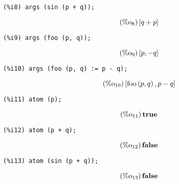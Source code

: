 \documentclass[12pt,leqno]{article}
\begin{document}
\begin{enumerate}
\begin{verbatim}
(%i8) args (sin (p + q));
\end{verbatim}
\begin{equation}
\tag{$\mathop{\mathrm{\%o}}_{8}$}\left[q+p\right]
\label{eq:doc-group1-code10-8-1}
\end{equation}
\begin{verbatim}
(%i9) args (foo (p, q));
\end{verbatim}
\begin{equation}
\tag{$\mathop{\mathrm{\%o}}_{9}$}\left[p, -q\right]
\label{eq:doc-group1-code10-9-1}
\end{equation}
\begin{verbatim}
(%i10) args (foo (p, q) := p - q);
\end{verbatim}
\begin{equation}
\tag{$\mathop{\mathrm{\%o}}_{10}$}\left[\mathop{\mathrm{foo}}\left(p, q\right), p-q\right]
\label{eq:doc-group1-code10-10-1}
\end{equation}
\begin{verbatim}
(%i11) atom (p);
\end{verbatim}
\begin{equation}
\tag{$\mathop{\mathrm{\%o}}_{11}$}\mathop{\mathbf{true}}
\label{eq:doc-group1-code10-11-1}
\end{equation}
\begin{verbatim}
(%i12) atom (p + q);
\end{verbatim}
\begin{equation}
\tag{$\mathop{\mathrm{\%o}}_{12}$}\mathop{\mathbf{false}}
\label{eq:doc-group1-code10-12-1}
\end{equation}
\begin{verbatim}
(%i13) atom (sin (p + q));
\end{verbatim}
\begin{equation}
\tag{$\mathop{\mathrm{\%o}}_{13}$}\mathop{\mathbf{false}}
\label{eq:doc-group1-code10-13-1}
\end{equation}



\end{enumerate}
\end{document}

